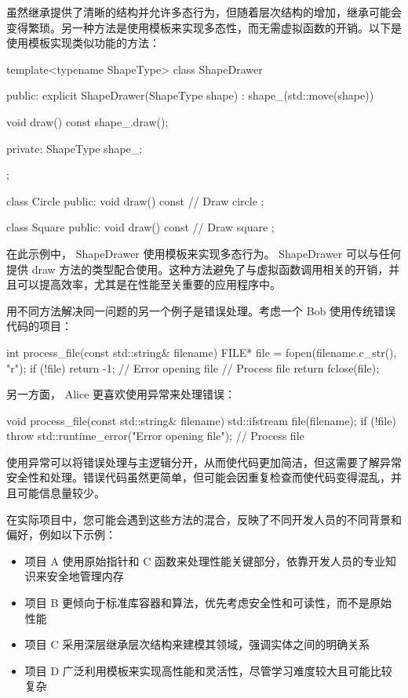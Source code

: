 虽然继承提供了清晰的结构并允许多态行为，但随着层次结构的增加，继承可能会变得繁琐。另一种方法是使用模板来实现多态性，而无需虚拟函数的开销。以下是使用模板实现类似功能的方法：

\begin{cpp}
template<typename ShapeType>
class ShapeDrawer {
public:
    explicit ShapeDrawer(ShapeType shape) : shape_(std::move(shape)){}

    void draw() const {
        shape_.draw();
    }

private:
    ShapeType shape_;
};

class Circle {
public:
    void draw() const {
        // Draw circle
    }
};

class Square {
public:
    void draw() const {
        // Draw square
    }
};
\end{cpp}

在此示例中， ShapeDrawer 使用模板来实现多态行为。 ShapeDrawer 可以与任何提供 draw 方法的类型配合使用。这种方法避免了与虚拟函数调用相关的开销，并且可以提高效率，尤其是在性能至关重要的应用程序中。


用不同方法解决同一问题的另一个例子是错误处理。考虑一个 Bob 使用传统错误代码的项目：

\begin{cpp}
int process_file(const std::string& filename) {
    FILE* file = fopen(filename.c_str(), "r");
    if (!file) {
        return -1; // Error opening file
    }
    // Process file
    return fclose(file);
}
\end{cpp}

另一方面， Alice 更喜欢使用异常来处理错误：

\begin{cpp}
void process_file(const std::string& filename) {
    std::ifstream file(filename);
    if (!file) {
        throw std::runtime_error("Error opening file");
    }
    // Process file
}
\end{cpp}

使用异常可以将错误处理与主逻辑分开，从而使代码更加简洁，但这需要了解异常安全性和处理。错误代码虽然更简单，但可能会因重复检查而使代码变得混乱，并且可能信息量较少。


在实际项目中，您可能会遇到这些方法的混合，反映了不同开发人员的不同背景和偏好，例如以下示例：

\begin{itemize}
\item
项目 A 使用原始指针和 C 函数来处理性能关键部分，依靠开发人员的专业知识来安全地管理内存

\item
项目 B 更倾向于标准库容器和算法，优先考虑安全性和可读性，而不是原始性能

\item
项目 C 采用深层继承层次结构来建模其领域，强调实体之间的明确关系

\item
项目 D 广泛利用模板来实现高性能和灵活性，尽管学习难度较大且可能比较复杂
\end{itemize}

